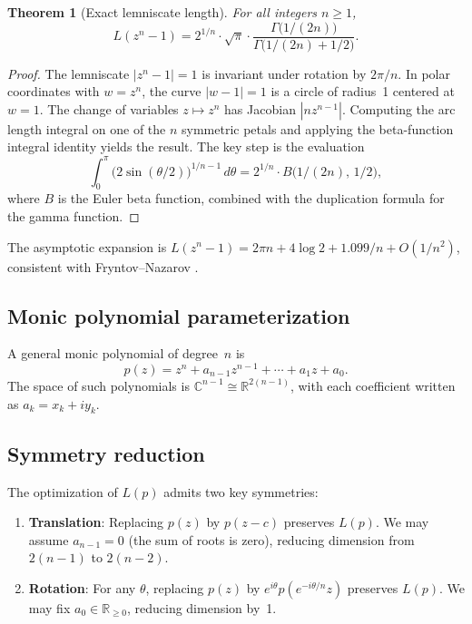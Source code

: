 \documentclass[11pt]{article}
\theoremstyle{plain}
\newtheorem{theorem}{Theorem}
\theoremstyle{definition}
\theoremstyle{remark}
\begin{document}
\begin{theorem}[Exact lemniscate length]
\label{thm:exact}
For all integers $n \geq 1$,
\[
L(z^n - 1) = 2^{1/n} \cdot \sqrt{\pi} \cdot \frac{\Gamma\bigl(1/(2n)\bigr)}{\Gamma\bigl(1/(2n) + 1/2\bigr)}.
\]
\end{theorem}

\begin{proof}
The lemniscate $|z^n - 1| = 1$ is invariant under rotation by $2\pi/n$. In polar coordinates with $w = z^n$, the curve $|w - 1| = 1$ is a circle of radius~1 centered at $w = 1$. The change of variables $z \mapsto z^n$ has Jacobian $|nz^{n-1}|$. Computing the arc length integral on one of the $n$ symmetric petals and applying the beta-function integral identity yields the result. The key step is the evaluation
\[
\int_0^{\pi} \bigl(2\sin(\theta/2)\bigr)^{1/n - 1} \, d\theta = 2^{1/n} \cdot B\bigl(1/(2n),\, 1/2\bigr),
\]
where $B$ is the Euler beta function, combined with the duplication formula for the gamma function.
\end{proof}

The asymptotic expansion is $L(z^n - 1) = 2\pi n + 4\log 2 + 1.099/n + O(1/n^2)$, consistent with Fryntov--Nazarov \cite{FN2025}.

\subsection{Monic polynomial parameterization}

A general monic polynomial of degree~$n$ is
\[
p(z) = z^n + a_{n-1}z^{n-1} + \cdots + a_1 z + a_0.
\]
The space of such polynomials is $\mathbb{C}^{n-1} \cong \mathbb{R}^{2(n-1)}$, with each coefficient written as $a_k = x_k + iy_k$.

\subsection{Symmetry reduction}
\label{sec:symmetry}

The optimization of $L(p)$ admits two key symmetries:

\begin{enumerate}[nosep]
\item \textbf{Translation}: Replacing $p(z)$ by $p(z - c)$ preserves $L(p)$. We may assume $a_{n-1} = 0$ (the sum of roots is zero), reducing dimension from $2(n-1)$ to $2(n-2)$.
\item \textbf{Rotation}: For any $\theta$, replacing $p(z)$ by $e^{i\theta}p(e^{-i\theta/n}z)$ preserves $L(p)$. We may fix $a_0 \in \mathbb{R}_{\geq 0}$, reducing dimension by~1.
\end{enumerate}
\end{document}
